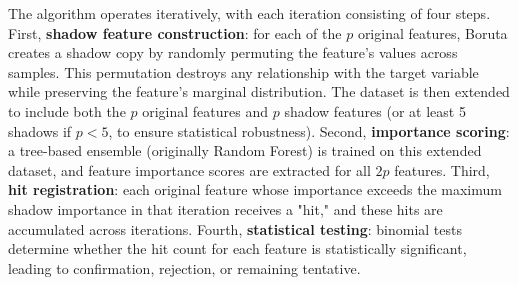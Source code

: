 \documentclass[runningheads]{llncs}
\newcommand{\writeme}[1]{\todo[inline,color=yellow!40]{WRITE: #1}}
\begin{document}
The algorithm operates iteratively, with each iteration consisting of four steps. First, \textbf{shadow feature construction}: for each of the $p$ original features, Boruta creates a shadow copy by randomly permuting the feature's values across samples. This permutation destroys any relationship with the target variable while preserving the feature's marginal distribution. The dataset is then extended to include both the $p$ original features and $p$ shadow features (or at least 5 shadows if $p < 5$, to ensure statistical robustness). Second, \textbf{importance scoring}: a tree-based ensemble (originally Random Forest) is trained on this extended dataset, and feature importance scores are extracted for all $2p$ features. Third, \textbf{hit registration}: each original feature whose importance exceeds the maximum shadow importance in that iteration receives a "hit," and these hits are accumulated across iterations. Fourth, \textbf{statistical testing}: binomial tests determine whether the hit count for each feature is statistically significant, leading to confirmation, rejection, or remaining tentative.


\end{document}
